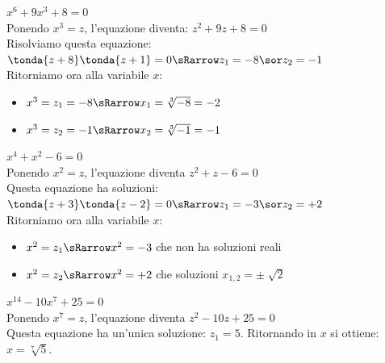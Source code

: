 \begin{esempio}
  \(x^6+9x^3+8=0\)
\\[4pt]
  Ponendo \(x^3=z\), l'equazione diventa: \(z^2+9z+8=0\)
\\[4pt]
  Risolviamo questa equazione: 
  \(\tonda{z+8}\tonda{z+1}=0 \sRarrow z_1=-8 \sor z_2=-1\)
\\[4pt]
  Ritorniamo ora alla variabile \(x\):
  \begin{itemize}
    \item \(x^3=z_1=-8 \sRarrow x_1=\sqrt[3]{-8}=-2\) 
    \item \(x^3=z_2=-1 \sRarrow x_2=\sqrt[3]{-1}=-1\)
  \end{itemize}
\end{esempio}

\begin{esempio}
  \(x^4+x^2-6=0\)
  \\[4pt]
  Ponendo \(x^2=z\), l'equazione diventa \(z^2+z-6=0\) 
  \\[4pt]
  Questa equazione ha soluzioni:
  \(\tonda{z+3}\tonda{z-2}=0 \sRarrow z_1=-3 \sor z_2=+2\)
  \\[4pt]
  Ritorniamo ora alla variabile \(x\):
  \begin{itemize}
    \item \(x^2=z_1 \sRarrow x^2=-3\) che non ha soluzioni reali
    \item \(x^2=z_2 \sRarrow x^2=+2\) che soluzioni \(x_{1,2}=\pm \sqrt[]{2}\)
  \end{itemize}
\end{esempio}

\begin{esempio}
  \(x^{14}-10x^7+25=0\) 
  \\[4pt]
  Ponendo \(x^7=z\), l'equazione diventa \(z^2-10z+25=0\)
  \\[4pt]
  Questa equazione ha un'unica soluzione: \(z_1=5\). Ritornando in \(x\) si ottiene: \(x = \sqrt[7]{5}\).
\end{esempio}


